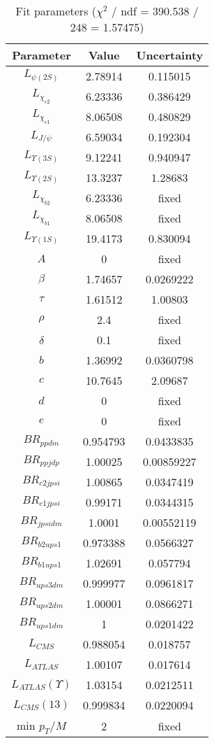 \begin{table}
\centering
\begin{tabular}{c|c|c}
Parameter & Value & Uncertainty \\
\hline
$L_{\psi(2S)}$ & 2.78914 & 0.115015 \\
$L_{\chi_{c2}}$ & 6.23336 & 0.386429 \\
$L_{\chi_{c1}}$ & 8.06508 & 0.480829 \\
$L_{J/\psi}$ & 6.59034 & 0.192304 \\
$L_{\Upsilon(3S)}$ & 9.12241 & 0.940947 \\
$L_{\Upsilon(2S)}$ & 13.3237 & 1.28683 \\
$L_{\chi_{b2}}$ & 6.23336 & fixed \\
$L_{\chi_{b1}}$ & 8.06508 & fixed \\
$L_{\Upsilon(1S)}$ & 19.4173 & 0.830094 \\
$A$ & 0 & fixed \\
$\beta$ & 1.74657 & 0.0269222 \\
$\tau$ & 1.61512 & 1.00803 \\
$\rho$ & 2.4 & fixed \\
$\delta$ & 0.1 & fixed \\
$b$ & 1.36992 & 0.0360798 \\
$c$ & 10.7645 & 2.09687 \\
$d$ & 0 & fixed \\
$e$ & 0 & fixed \\
$BR_{ppdm}$ & 0.954793 & 0.0433835 \\
$BR_{ppjdp}$ & 1.00025 & 0.00859227 \\
$BR_{c2jpsi}$ & 1.00865 & 0.0347419 \\
$BR_{c1jpsi}$ & 0.99171 & 0.0344315 \\
$BR_{jpsidm}$ & 1.0001 & 0.00552119 \\
$BR_{b2ups1}$ & 0.973388 & 0.0566327 \\
$BR_{b1ups1}$ & 1.02691 & 0.057794 \\
$BR_{ups3dm}$ & 0.999977 & 0.0961817 \\
$BR_{ups2dm}$ & 1.00001 & 0.0866271 \\
$BR_{ups1dm}$ & 1 & 0.0201422 \\
$L_{CMS}$ & 0.988054 & 0.018757 \\
$L_{ATLAS}$ & 1.00107 & 0.017614 \\
$L_{ATLAS}(\Upsilon)$ & 1.03154 & 0.0212511 \\
$L_{CMS}(13)$ & 0.999834 & 0.0220094 \\
min $p_T/M$ & 2 & fixed \\
\end{tabular}
\caption{Fit parameters ($\chi^2$ / ndf = 390.538 / 248 = 1.57475)}
\end{table}
